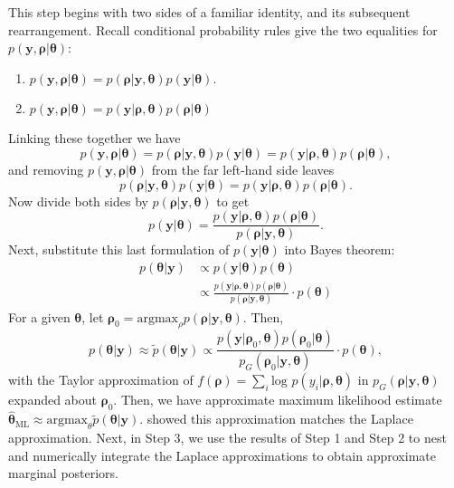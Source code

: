 This step begins with two sides of a familiar identity, and its subsequent rearrangement. Recall conditional probability rules give the two equalities for $p(\pmb{y} , \pmb{\rho} | \pmb{\theta})$:
\begin{enumerate}
\item $p(\pmb{y} , \pmb{\rho} | \pmb{\theta}) = p(\pmb{\rho} | \pmb{y}, \pmb{\theta}) p(\pmb{y} | \pmb{\theta})$. 
\item $p(\pmb{y} , \pmb{\rho} | \pmb{\theta}) = p(\pmb{y} | \pmb{\rho}, \pmb{\theta}) p(\pmb{\rho} | \pmb{\theta})$
\end{enumerate} 
Linking these together we have
$$ p(\pmb{y} , \pmb{\rho} | \pmb{\theta}) = p(\pmb{\rho} | \pmb{y}, \pmb{\theta}) p(\pmb{y} | \pmb{\theta}) = p(\pmb{y} | \pmb{\rho}, \pmb{\theta}) p(\pmb{\rho} | \pmb{\theta}),$$
and removing $p(\pmb{y} , \pmb{\rho} | \pmb{\theta})$ from the far left-hand side leaves
$$ p(\pmb{\rho} | \pmb{y}, \pmb{\theta}) p(\pmb{y} | \pmb{\theta}) = p(\pmb{y} | \pmb{\rho}, \pmb{\theta}) p(\pmb{\rho} | \pmb{\theta}). $$
Now divide both sides by $p(\pmb{\rho} | \pmb{y}, \pmb{\theta})$ to get 
\begin{equation}
p(\pmb{y} | \pmb{\theta}) = \frac{p(\pmb{y} | \pmb{\rho}, \pmb{\theta}) p(\pmb{\rho} | \pmb{\theta})} {p(\pmb{\rho} | \pmb{y}, \pmb{\theta})}.
\end{equation}
Next, substitute this last formulation of $p(\pmb{y}|\pmb{\theta})$ into Bayes theorem:
\begin{align}
p(\pmb{\theta}|\pmb{y}) & \propto p(\pmb{y}|\pmb{\theta})p(\pmb{\theta}) \nonumber \\
& \propto \frac{p(\pmb{y} | \pmb{\rho}, \pmb{\theta}) p(\pmb{\rho} | \pmb{\theta})}{p(\pmb{\rho} | \pmb{y}, \pmb{\theta})} \cdot p(\pmb{\theta})
\end{align}
For a given $\pmb{\theta}$, let $\pmb{\rho}_{0} = \text{argmax}_{\rho}p(\pmb{\rho}|\pmb{y},\pmb{\theta})$. Then,
\begin{equation} \label{eq:la}
p(\pmb{\theta}|\pmb{y}) \approx \tilde{p}(\pmb{\theta}|\pmb{y}) \propto  \frac{p(\pmb{y} | \pmb{\rho}_{0}, \pmb{\theta}) p(\pmb{\rho}_{0} | \pmb{\theta})}{p_{G}(\pmb{\rho}_{0} | \pmb{y}, \pmb{\theta})} \cdot p(\pmb{\theta}),
\end{equation}
with the Taylor approximation of $f(\pmb{\rho}) = \sum_{i} \text{log }p(y_{i}|\pmb{\rho}, \pmb{\theta})$ in $p_{G}(\pmb{\rho} | \pmb{y}, \pmb{\theta})$ expanded about $\pmb{\rho}_{0}$. Then, we have approximate maximum likelihood estimate $\hat{\pmb{\theta}}_{\text{ML}} \approx \text{argmax}_{\theta} \tilde{p}(\pmb{\theta}|\pmb{y})$. \cite{Tierney1986} showed this approximation matches the Laplace approximation. 
Next, in Step 3, we use the results of Step 1 and Step 2 to nest and numerically integrate the Laplace approximations to obtain approximate marginal posteriors.

